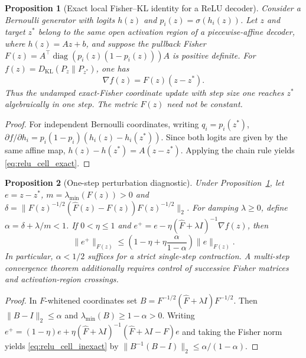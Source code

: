\documentclass[a4paper,fleqn]{cas-dc}
\newtheorem{proposition}{Proposition}
\begin{document}
\begin{proposition}[Exact local Fisher--KL identity for a ReLU decoder]
  \label{prop:relu_cell_kl}
  Consider a Bernoulli generator with logits $h(z)$ and
  $p_i(z)=\sigma(h_i(z))$. Let $z$ and target $z^*$ belong to the
  \emph{same} open activation region of a piecewise-affine decoder,
  where $h(z)=Az+b$, and suppose the pullback Fisher
  $F(z)=A^\top\operatorname{diag}(p_i(z)(1-p_i(z)))A$
  is positive definite. For
  $f(z)=D_{\mathrm{KL}}(P_z\|P_{z^*})$, one has
  \begin{equation}
    \nabla f(z)=F(z)(z-z^*).\label{eq:relu_cell_exact}
  \end{equation}
  Thus the \emph{undamped exact-Fisher coordinate update} with
  step size one reaches $z^*$ algebraically in one step.
  The metric $F(z)$ need not be constant.
\end{proposition}
\begin{proof}
For independent Bernoulli coordinates, writing $q_i=p_i(z^*)$,
$\partial f/\partial h_i=p_i(1-p_i)(h_i(z)-h_i(z^*))$.
Since both logits are given by the same affine map,
$h(z)-h(z^*)=A(z-z^*)$. Applying the chain rule yields
\eqref{eq:relu_cell_exact}.
\end{proof}

\begin{proposition}[One-step perturbation diagnostic]
  \label{prop:relu_cell_inexact}
  Under Proposition~\ref{prop:relu_cell_kl}, let
  $e=z-z^*$, $m=\lambda_{\min}(F(z))>0$ and
  $\delta=\|F(z)^{-1/2}(\widehat F(z)-F(z))F(z)^{-1/2}\|_2$.
  For damping $\lambda\ge0$, define $\alpha=\delta+\lambda/m<1$.
  If $0<\eta\le1$ and
  $e^+=e-\eta(\widehat F+\lambda I)^{-1}\nabla f(z)$,
  then
  \begin{equation}
    \|e^+\|_{F(z)}\le
    \left(1-\eta+\eta\frac{\alpha}{1-\alpha}\right)
    \|e\|_{F(z)}.\label{eq:relu_cell_inexact}
  \end{equation}
  In particular, $\alpha<1/2$ suffices for a strict \emph{single-step}
  contraction. A multi-step convergence theorem additionally requires
  control of successive Fisher matrices and activation-region crossings.
\end{proposition}
\begin{proof}
In $F$-whitened coordinates set $B=F^{-1/2}(\widehat F+\lambda I)F^{-1/2}$.
Then $\|B-I\|_2\le\alpha$ and
$\lambda_{\min}(B)\ge1-\alpha>0$.
Writing $e^+=(1-\eta)e+\eta(\widehat F+\lambda I)^{-1}
(\widehat F+\lambda I-F)e$ and taking the Fisher norm yields
\eqref{eq:relu_cell_inexact} by $\|B^{-1}(B-I)\|_2
\le\alpha/(1-\alpha)$.
\end{proof}
\end{document}
